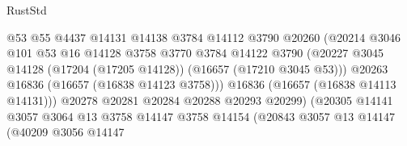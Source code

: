 \begin{lexlean}{RustStd}
\begin{coremodule}
                                          @53
                                          @55
                                          @4437
                                          @14131
                                          @14138
                                          @3784
                                          @14112
                                          @3790
                                          @20260
                                          (@20214
                                            @3046
                                            @101
                                            @53
                                            @16
                                            @14128
                                            @3758
                                            @3770
                                            @3784
                                            @14122
                                            @3790
                                            (@20227
                                              @3045
                                              @14128
                                              (@17204 (@17205 @14128))
                                              (@16657 (@17210 @3045 @53)))
                                            @20263
                                            @16836
                                            (@16657 (@16838 @14123 @3758)))
                                          @16836
                                          (@16657 (@16838 @14113 @14131)))
                                        @20278
                                        @20281
                                        @20284
                                        @20288
                                        @20293
                                        @20299)
                                      (@20305
                                        @14141
                                        @3057
                                        @3064
                                        @13
                                        @3758
                                        @14147
                                        @3758
                                        @14154
                                        (@20843
                                          @3057
                                          @13
                                          @14147
                                          (@40209
                                            @3056
                                            @14147

\end{coremodule}
\end{lexlean}
